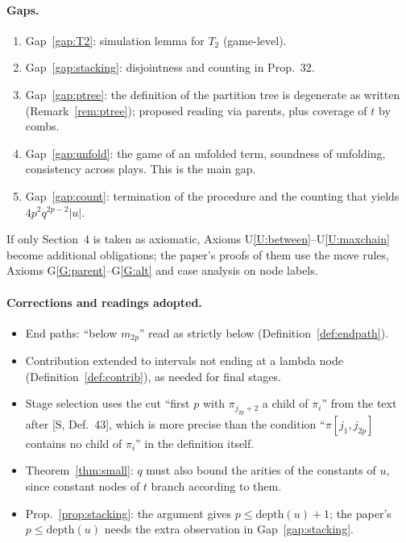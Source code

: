 \documentclass[11pt]{article}
\newcommand{\depth}{\mathrm{depth}}
\newcommand{\iv}[2]{\pi[#1,#2]}
\theoremstyle{plain}
\theoremstyle{definition}
\theoremstyle{remark}
\begin{document}
\paragraph{Gaps.}
\begin{enumerate}
\item Gap~\ref{gap:T2}: simulation lemma for $T_2$ (game-level).
\item Gap~\ref{gap:stacking}: disjointness and counting in Prop.~32.
\item Gap~\ref{gap:ptree}: the definition of the partition tree is
  degenerate as written (Remark~\ref{rem:ptree}); proposed reading via
  parents, plus coverage of $t$ by combs.
\item Gap~\ref{gap:unfold}: the game of an unfolded term, soundness of
  unfolding, consistency across plays.  This is the main gap.
\item Gap~\ref{gap:count}: termination of the procedure and the counting
  that yields $4p^2q^{2p-2}|u|$.
\end{enumerate}
If only Section~4 is taken as axiomatic, Axioms U\ref{U:between}--U\ref{U:maxchain}
become additional obligations; the paper's proofs of them use the move
rules, Axioms G\ref{G:parent}--G\ref{G:alt} and case analysis on node
labels.

\paragraph{Corrections and readings adopted.}
\begin{itemize}
\item End paths: ``below $m_{2p}$'' read as strictly below
  (Definition~\ref{def:endpath}).
\item Contribution extended to intervals not ending at a lambda node
  (Definition~\ref{def:contrib}), as needed for final stages.
\item Stage selection uses the cut ``first $p$ with
  $\pi_{j_{2p}+2}$ a child of $\pi_i$'' from the text after [S, Def.~43],
  which is more precise than the condition ``$\iv{j_1}{j_{2p}}$ contains
  no child of $\pi_i$'' in the definition itself.
\item Theorem~\ref{thm:small}: $q$ must also bound the arities of the
  constants of $u$, since constant nodes of $t$ branch according to
  them.
\item Prop.~\ref{prop:stacking}: the argument gives $p\le\depth(u)+1$;
  the paper's $p\le\depth(u)$ needs the extra observation in
  Gap~\ref{gap:stacking}.
\end{itemize}
\end{document}
